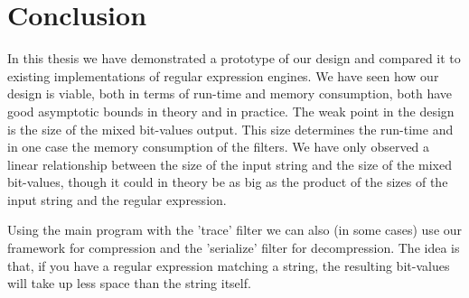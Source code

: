 \section{Conclusion}
\label{sec:conclusion}

In this thesis we have demonstrated a prototype of our design and
compared it to existing implementations of regular expression
engines. We have seen how our design is viable, both in terms of
run-time and memory consumption, both have good asymptotic bounds in
theory and in practice. The weak point in the design is the size of
the mixed bit-values output. This size determines the run-time and in
one case the memory consumption of the filters. We have only observed
a linear relationship between the size of the input string and the
size of the mixed bit-values, though it could in theory be as big as
the product of the sizes of the input string and the regular
expression.

Using the main program with the 'trace' filter we can also (in some
cases) use our framework for compression and the 'serialize' filter
for decompression. The idea is that, if you have a regular expression
matching a string, the resulting bit-values will take up less space
than the string itself. 
